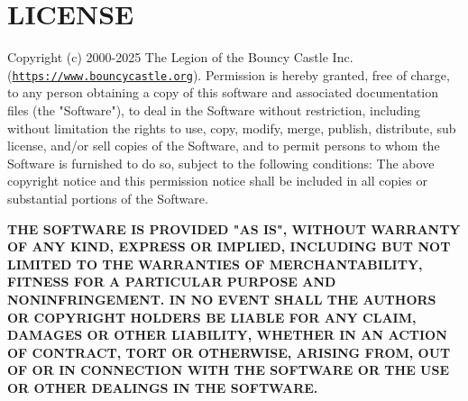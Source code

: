 \chapter{LICENSE }
\hypertarget{md__c_1_2_users_2_david_01_oviedo_2_desktop_2_viniloteca_2packages_2_bouncy_castle_8_cryptography_82_86_82_2_l_i_c_e_n_s_e}{}\label{md__c_1_2_users_2_david_01_oviedo_2_desktop_2_viniloteca_2packages_2_bouncy_castle_8_cryptography_82_86_82_2_l_i_c_e_n_s_e}
Copyright (c) 2000-\/2025 The Legion of the Bouncy Castle Inc. (\href{https://www.bouncycastle.org}{\texttt{https:\+/\+/\+www.\+bouncycastle.\+org}}). Permission is hereby granted, free of charge, to any person obtaining a copy of this software and associated documentation files (the "{}\+Software"{}), to deal in the Software without restriction, including without limitation the rights to use, copy, modify, merge, publish, distribute, sub license, and/\+or sell copies of the Software, and to permit persons to whom the Software is furnished to do so, subject to the following conditions:\+ The above copyright notice and this permission notice shall be included in all copies or substantial portions of the Software.

{\bfseries{THE SOFTWARE IS PROVIDED "{}\+AS IS"{}, WITHOUT WARRANTY OF ANY KIND, EXPRESS OR IMPLIED, INCLUDING BUT NOT LIMITED TO THE WARRANTIES OF MERCHANTABILITY, FITNESS FOR A PARTICULAR PURPOSE AND NONINFRINGEMENT. IN NO EVENT SHALL THE AUTHORS OR COPYRIGHT HOLDERS BE LIABLE FOR ANY CLAIM, DAMAGES OR OTHER LIABILITY, WHETHER IN AN ACTION OF CONTRACT, TORT OR OTHERWISE, ARISING FROM, OUT OF OR IN CONNECTION WITH THE SOFTWARE OR THE USE OR OTHER DEALINGS IN THE SOFTWARE.}} 